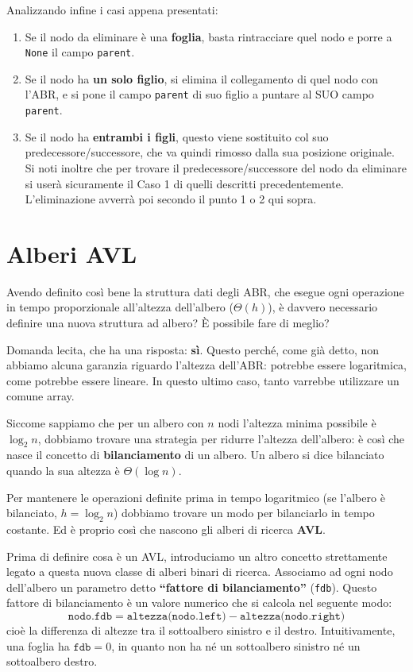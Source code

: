 \documentclass[12pt]{report}
\begin{document}
	Analizzando infine i casi appena presentati:
	\begin{enumerate}
		\item Se il nodo da eliminare è una \textbf{foglia}, basta rintracciare quel nodo e porre a \texttt{None} il campo \texttt{parent}.
		\item Se il nodo ha \textbf{un solo figlio}, si elimina il collegamento di quel nodo con l'ABR, e si pone il campo \texttt{parent} di suo figlio a puntare al SUO campo \texttt{parent}.
		\item Se il nodo ha \textbf{entrambi i figli}, questo viene sostituito col suo predecessore/successore, che va quindi rimosso dalla sua posizione originale. Si noti inoltre che per trovare il predecessore/successore del nodo da eliminare si userà sicuramente il Caso 1 di quelli descritti precedentemente. L'eliminazione avverrà poi secondo il punto 1 o 2 qui sopra.
	\end{enumerate}
	
	\newpage
	\section{Alberi AVL}
	Avendo definito così bene la struttura dati degli ABR, che esegue ogni operazione in tempo proporzionale all'altezza dell'albero ($\Theta(h)$), è davvero necessario definire una nuova struttura ad albero? È possibile fare di meglio?
	
	Domanda lecita, che ha una risposta: \textbf{sì}. Questo perché, come già detto, non abbiamo alcuna garanzia riguardo l'altezza dell'ABR: potrebbe essere logaritmica, come potrebbe essere lineare. In questo ultimo caso, tanto varrebbe utilizzare un comune array.
	
	Siccome sappiamo che per un albero con $n$ nodi l'altezza minima possibile è $\log_2 n$, dobbiamo trovare una strategia per ridurre l'altezza dell'albero: è così che nasce il concetto di \textbf{bilanciamento} di un albero. Un albero si dice bilanciato quando la sua altezza è $\Theta(\log n)$.
	
	Per mantenere le operazioni definite prima in tempo logaritmico (se l'albero è bilanciato, $h = \log_2 n$) dobbiamo trovare un modo per bilanciarlo in tempo costante. Ed è proprio così che nascono gli alberi di ricerca \textbf{AVL}.
	
	Prima di definire cosa è un AVL, introduciamo un altro concetto strettamente legato a questa nuova classe di alberi binari di ricerca. Associamo ad ogni nodo dell'albero un parametro detto \textbf{``fattore di bilanciamento''} (\texttt{fdb}). Questo fattore di bilanciamento è un valore numerico che si calcola nel seguente modo:
	\[
	\texttt{nodo.fdb} = \texttt{altezza(nodo.left)} - \texttt{altezza(nodo.right)}
	\]
	cioè la differenza di altezze tra il sottoalbero sinistro e il destro. Intuitivamente, una foglia ha $\texttt{fdb} = 0$, in quanto non ha né un sottoalbero sinistro né un sottoalbero destro.
	
\end{document}
